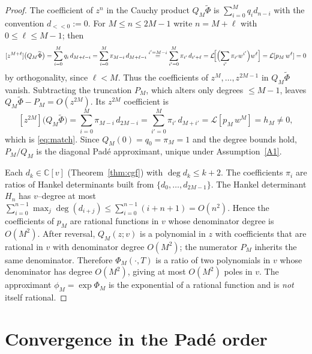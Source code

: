 \documentclass[11pt]{article}
\newcommand{\C}{\mathbb{C}}
\newcommand{\Lc}{\mathcal{L}}
\begin{document}
\begin{proof}
The coefficient of $z^n$ in the Cauchy product $Q_M\widetilde\Phi$ is
$\sum_{i=0}^M q_i d_{n-i}$ with the convention $d_{<<0}:=0$. For
$M\le n\le 2M-1$ write $n=M+\ell$ with $0\le\ell\le M-1$; then
\begin{equation}\label{eq:match-pf1}
[z^{M+\ell}]\bigl(Q_M\widetilde\Phi\bigr)
=\sum_{i=0}^M q_i\,d_{M+\ell-i}
=\sum_{i=0}^M\pi_{M-i}\,d_{M+\ell-i}
\overset{i'=M-i}{=}\sum_{i'=0}^M\pi_{i'}\,d_{i'+\ell}
=\Lc\!\Bigl[\Bigl(\sum_{i'}\pi_{i'}w^{i'}\Bigr)w^{\ell}\Bigr]
=\Lc[p_M\,w^{\ell}]=0
\end{equation}
by orthogonality, since $\ell<M$. Thus the coefficients of
$z^{M},\dots,z^{2M-1}$ in $Q_M\widetilde\Phi$ vanish. Subtracting the
truncation $P_M$, which alters only degrees $\le M-1$, leaves
$Q_M\widetilde\Phi-P_M=O(z^{2M})$. Its $z^{2M}$ coefficient is
\begin{equation}\label{eq:match-pf2}
[z^{2M}]\bigl(Q_M\widetilde\Phi\bigr)
=\sum_{i=0}^M\pi_{M-i}\,d_{2M-i}
=\sum_{i'=0}^M\pi_{i'}\,d_{M+i'}
=\Lc[p_M\,w^{M}]=h_M\neq0,
\end{equation}
which is \eqref{eq:match}. Since $Q_M(0)=q_0=\pi_M=1$ and the degree bounds
hold, $P_M/Q_M$ is the diagonal Pad\'e approximant, unique under
Assumption~\ref{A1}.

Each $d_k\in\C[v]$ (Theorem~\ref{thm:cgf}) with $\deg d_k\le k+2$. The
coefficients $\pi_i$ are ratios of Hankel determinants built from
$\{d_0,\dots,d_{2M-1}\}$. The Hankel determinant $H_n$ has $v$--degree at
most $\sum_{i=0}^{n-1}\max_{j}\deg(d_{i+j})\le\sum_{i=0}^{n-1}(i+n+1)
=O(n^2)$. Hence the coefficients of $p_M$ are rational functions in $v$
whose denominator degree is $O(M^2)$. After reversal, $Q_M(z;v)$ is a
polynomial in $z$ with coefficients that are rational in $v$ with
denominator degree $O(M^2)$; the numerator $P_M$ inherits the same
denominator. Therefore $\Phi_M(\cdot,T)$ is a ratio of two polynomials in
$v$ whose denominator has degree $O(M^2)$, giving at most $O(M^2)$ poles in
$v$. The approximant $\phi_M=\exp\Phi_M$ is the exponential of a rational
function and is \emph{not} itself rational.
\end{proof}

\section{Convergence in the Pad\'e order}\label{sec:conv}
\end{document}
